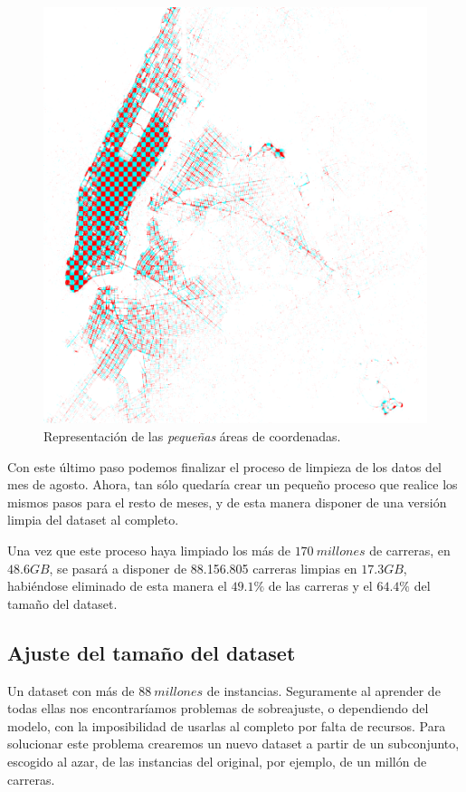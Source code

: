 \begin{figure}[H]
  \centering
  \includegraphics[width=140mm]{figures/ch_05/map_3.png}
  \caption{Representación de las \emph{pequeñas} áreas de coordenadas.}
  \label{fig:5.11}
\end{figure}

Con este último paso podemos finalizar el proceso de limpieza de los datos del mes de agosto. Ahora, tan sólo quedaría crear un pequeño proceso que realice los mismos pasos para el resto de meses, y de esta manera disponer de una versión limpia del dataset al completo.

Una vez que este proceso haya limpiado los más de $170\:millones$ de carreras, en $48.6GB$, se pasará a disponer de 88.156.805 carreras limpias en $17.3GB$, habiéndose eliminado de esta manera el $49.1\%$ de las carreras y el $64.4\%$ del tamaño del dataset.

\subsection{Ajuste del tamaño del dataset} \label{subsec:5.2.3}

Un dataset con más de $88\:millones$ de instancias. Seguramente al aprender de todas ellas nos encontraríamos problemas de sobreajuste, o dependiendo del modelo, con la imposibilidad de usarlas al completo por falta de recursos. Para solucionar este problema crearemos un nuevo dataset a partir de un subconjunto, escogido al azar, de las instancias del original, por ejemplo, de un millón de carreras.


